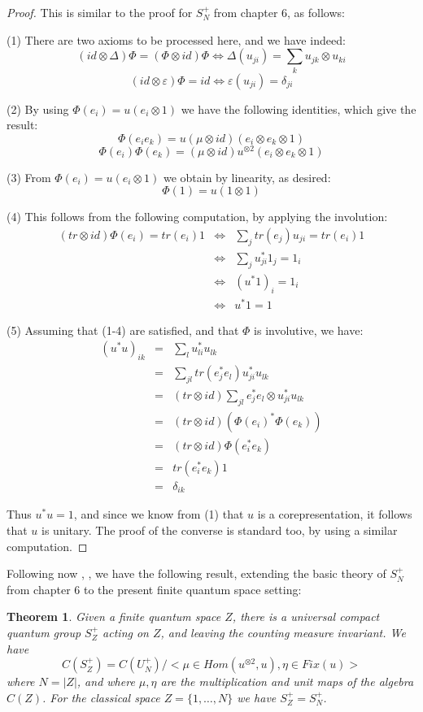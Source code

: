 \documentclass[12pt]{amsbook}
\newtheorem{theorem}{Theorem}[chapter]
\begin{document}
\begin{proof}
This is similar to the proof for $S_N^+$ from chapter 6, as follows:

\medskip

(1) There are two axioms to be processed here, and we have indeed:
$$(id\otimes\Delta)\Phi=(\Phi\otimes id)\Phi
\iff\Delta(u_{ji})=\sum_ku_{jk}\otimes u_{ki}$$
$$(id\otimes\varepsilon)\Phi=id
\iff\varepsilon(u_{ji})=\delta_{ji}$$

(2) By using $\Phi(e_i)=u(e_i\otimes 1)$ we have the following identities, which give the result:
$$\Phi(e_ie_k)
=u(\mu\otimes id)(e_i\otimes e_k\otimes 1)$$
$$\Phi(e_i)\Phi(e_k)
=(\mu\otimes id)u^{\otimes 2}(e_i\otimes e_k\otimes 1)$$

(3) From $\Phi(e_i)=u(e_i\otimes1)$ we obtain by linearity, as desired:
$$\Phi(1)=u(1\otimes1)$$

(4) This follows from the following computation, by applying the involution:
\begin{eqnarray*}
(tr\otimes id)\Phi(e_i)=tr(e_i)1
&\iff&\sum_jtr(e_j)u_{ji}=tr(e_i)1\\
&\iff&\sum_ju_{ji}^*1_j=1_i\\
&\iff&(u^*1)_i=1_i\\
&\iff&u^*1=1
\end{eqnarray*}

(5) Assuming that (1-4) are satisfied, and that $\Phi$ is involutive, we have:
\begin{eqnarray*}
(u^*u)_{ik}
&=&\sum_lu_{li}^*u_{lk}\\
&=&\sum_{jl}tr(e_j^*e_l)u_{ji}^*u_{lk}\\
&=&(tr\otimes id)\sum_{jl}e_j^*e_l\otimes u_{ji}^*u_{lk}\\
&=&(tr\otimes id)(\Phi(e_i)^*\Phi(e_k))\\
&=&(tr\otimes id)\Phi(e_i^*e_k)\\
&=&tr(e_i^*e_k)1\\
&=&\delta_{ik}
\end{eqnarray*}

Thus $u^*u=1$, and since we know from (1) that $u$ is a corepresentation, it follows that $u$ is unitary. The proof of the converse is standard too, by using a similar computation.
\end{proof}

Following now \cite{ba2}, \cite{wan}, we have the following result, extending the basic theory of $S_N^+$ from chapter 6 to the present finite quantum space setting:

\begin{theorem}
Given a finite quantum space $Z$, there is a universal compact quantum group $S_Z^+$ acting on $Z$, and leaving the counting measure invariant. We have
$$C(S_Z^+)=C(U_N^+)\Big/\Big<\mu\in Hom(u^{\otimes2},u),\eta\in Fix(u)\Big>$$
where $N=|Z|$, and where $\mu,\eta$ are the multiplication and unit maps of the algebra $C(Z)$. For the classical space $Z=\{1,\ldots,N\}$ we have $S_Z^+=S_N^+$. 
\end{theorem}
\end{document}
